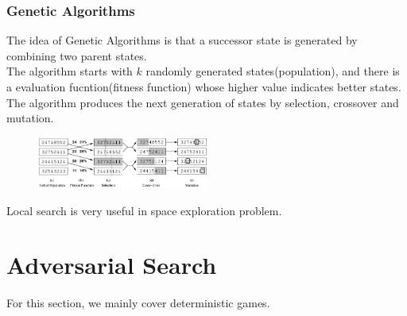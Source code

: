 \documentclass[12pt]{article}
\theoremstyle{definition}
\begin{document}
\subsubsection{Genetic Algorithms}
The idea of Genetic Algorithms is that a successor state is generated by combining two parent states.\\
The algorithm starts with $k$ randomly generated states(population), and there is a evaluation fucntion(fitness function) whose higher value indicates better states. The algorithm produces the next generation of states by selection, crossover and mutation.
\begin{figure}[t]
\centering
\includegraphics[width = 0.5\textwidth]{3_1.png}
\end{figure}
Local search is very useful in space exploration problem.
\clearpage
\section{Adversarial Search}
For this section, we mainly cover deterministic games.
\end{document}
